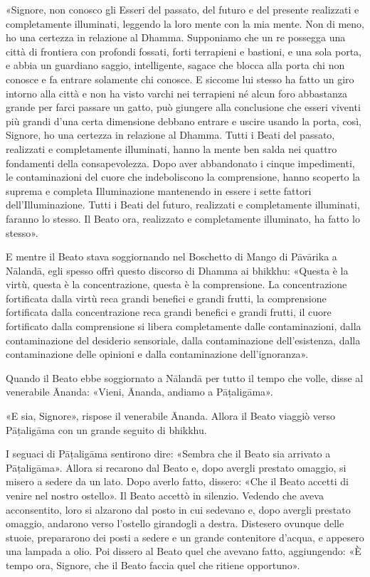 «Signore, non conosco gli Esseri del passato, del futuro e del presente
realizzati e completamente illuminati, leggendo la loro mente con la mia mente.
Non di meno, ho una certezza in relazione al Dhamma. Supponiamo che un re
possegga una città di frontiera con profondi fossati, forti terrapieni e
bastioni, e una sola porta, e abbia un guardiano saggio, intelligente, sagace
che blocca alla porta chi non conosce e fa entrare solamente chi conosce. E
siccome lui stesso ha fatto un giro intorno alla città e non ha visto varchi nei
terrapieni né alcun foro abbastanza grande per farci passare un gatto, può
giungere alla conclusione che esseri viventi più grandi d’una certa dimensione
debbano entrare e uscire usando la porta, così, Signore, ho una certezza in
relazione al Dhamma. Tutti i Beati del passato, realizzati e completamente
illuminati, hanno la mente ben salda nei quattro fondamenti della
consapevolezza. Dopo aver abbandonato i cinque impedimenti, le contaminazioni
del cuore che indeboliscono la comprensione, hanno scoperto la suprema e
completa Illuminazione mantenendo in essere i sette fattori dell’Illuminazione.
Tutti i Beati del futuro, realizzati e completamente illuminati, faranno lo
stesso. Il Beato ora, realizzato e completamente illuminato, ha fatto lo
stesso».


E mentre il Beato stava soggiornando nel Boschetto di Mango di Pāvārika a
Nālandā, egli spesso offrì questo discorso di Dhamma ai bhikkhu: «Questa è la
virtù, questa è la concentrazione, questa è la comprensione. La concentrazione
fortificata dalla virtù reca grandi benefici e grandi frutti, la comprensione
fortificata dalla concentrazione reca grandi benefici e grandi frutti, il cuore
fortificato dalla comprensione si libera completamente dalle contaminazioni,
dalla contaminazione del desiderio sensoriale, dalla contaminazione
dell’esistenza, dalla contaminazione delle opinioni e dalla contaminazione
dell’ignoranza».

Quando il Beato ebbe soggiornato a Nālandā per tutto il tempo che volle, disse
al venerabile Ānanda: «Vieni, Ānanda, andiamo a Pāṭaligāma».

«E sia, Signore», rispose il venerabile Ānanda. Allora il Beato viaggiò verso
Pāṭaligāma con un grande seguito di bhikkhu.

I seguaci di Pāṭaligāma sentirono dire: «Sembra che il Beato sia arrivato a
Pāṭaligāma». Allora si recarono dal Beato e, dopo avergli prestato omaggio, si
misero a sedere da un lato. Dopo averlo fatto, dissero: «Che il Beato accetti di
venire nel nostro ostello». Il Beato accettò in silenzio. Vedendo che aveva
acconsentito, loro si alzarono dal posto in cui sedevano e, dopo avergli
prestato omaggio, andarono verso l’ostello girandogli a destra. Distesero
ovunque delle stuoie, prepararono dei posti a sedere e un grande contenitore
d’acqua, e appesero una lampada a olio. Poi dissero al Beato quel che avevano
fatto, aggiungendo: «È tempo ora, Signore, che il Beato faccia quel che ritiene
opportuno».

